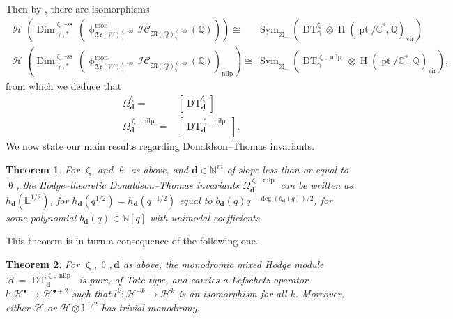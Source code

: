 \documentclass[a4paper,10pt]{amsart}
\newtheorem{theorem}{Theorem}[section]
\newcommand{\BC}{\pt/\mathbb{C}^*}
\newcommand{\dd}{\mathbf{d}}
\newcommand{\LL}{\mathbb{L}}
\newcommand{\QQ}{\mathbb{Q}}
\newcommand{\WWW}{\mathfrak{Tr}(W)}
\newcommand{\Mst}{\mathfrak{M}}
\newcommand{\ICS}{\mathcal{IC}}
\newcommand{\phim}[1]{\phi^{\mon}_{#1}}
\renewcommand{\theta}{\uptheta}
\renewcommand{\gamma}{\upgamma}
\renewcommand{\zeta}{\upzeta}
\renewcommand{\phi}{\upphi}
\DeclareMathOperator{\sst}{-ss}
\DeclareMathOperator{\nilp}{nilp}
\DeclareMathOperator{\Dim}{Dim}
\DeclareMathOperator{\mon}{mon}
\DeclareMathOperator{\DT}{DT}
\DeclareMathOperator{\Sym}{Sym}
\DeclareMathOperator{\pt}{pt}
\DeclareMathOperator{\Ss}{\overline{s}}
\DeclareMathOperator{\vir}{vir}
\DeclareMathOperator{\Ho}{\mathcal{H}}
\DeclareMathOperator{\HO}{H}
\begin{document}
Then by \cite[Thm.A]{DaMe15b}, there are isomorphisms
\begin{align}
\Ho\left(\Dim_{\gamma,*}^{\zeta_{\Ss}\sst}\left(\phim{\WWW^{\zeta_{\Ss}\sst}_{\gamma}}\ICS_{\Mst(Q)^{\zeta_{\Ss}\sst}_{\gamma}}(\mathbb{Q})\right)\right)\cong &\Sym_{\boxtimes_+}\left(  \DT_{\gamma}^{\zeta_{\Ss}}\otimes\HO(\BC,\QQ)_{\vir} \right)\\
\Ho\left(\Dim_{\gamma,*}^{\zeta_{\Ss}\sst}\left(\phim{\WWW^{\zeta_{\Ss}\sst}_{\gamma}}\ICS_{\Mst(Q)^{\zeta_{\Ss}\sst}_{\gamma}}(\mathbb{Q})\right)_{\nilp}\right)\cong &\Sym_{\boxtimes_+}\left(  \DT_{\gamma}^{\zeta_{\Ss},\nilp}\otimes\HO(\BC,\QQ)_{\vir} \right),\label{nilpver}
\end{align}
from which we deduce that 
\begin{align*}
\Omega^{\zeta_{\Ss}}_{\dd}=&[\DT^{\zeta_{\Ss}}_{\dd}]\\
\Omega^{\zeta_{\Ss},\nilp}_{\dd}=&[\DT^{\zeta_{\Ss},\nilp}_{\dd}].
\end{align*}
We now state our main results regarding Donaldson--Thomas invariants.
\begin{theorem}
\label{KPos}
For $\zeta_{\Ss}$ and $\theta_{\Ss}$ as above, and $\dd\in\mathbb{N}^m$ of slope less than or equal to $\theta_{\Ss}$, the Hodge--theoretic Donaldson--Thomas invariants $\Omega^{\zeta_{\Ss},\nilp}_{\dd}$ can be written as $h_{\dd}(\LL^{1/2})$, for $h_{\dd}(q^{1/2})=h_{\dd}(q^{-1/2})$ equal to $b_{\dd}(q)q^{{}-\deg(b_{\dd}(q))/2}$, for some polynomial $b_{\dd}(q)\in\mathbb{N}[q]$ with unimodal coefficients.
\end{theorem}
This theorem is in turn a consequence of the following one.
\begin{theorem}
\label{cohPos}
For $\zeta_{\Ss},\theta_{\Ss},\dd$ as above, the monodromic mixed Hodge module $\mathcal{H}=\DT^{\zeta_{\Ss},\nilp}_{\dd}$ is pure, of Tate type, and carries a Lefschetz operator $l\colon \mathcal{H}^{\bullet}\rightarrow \mathcal{H}^{\bullet+2}$ such that $l^k\colon \mathcal{H}^{-k}\rightarrow\mathcal{H}^k$ is an isomorphism for all $k$.  Moreover, either $\mathcal{H}$ or $\mathcal{H}\otimes\LL^{1/2}$ has trivial monodromy.
\end{theorem}
\end{document}
